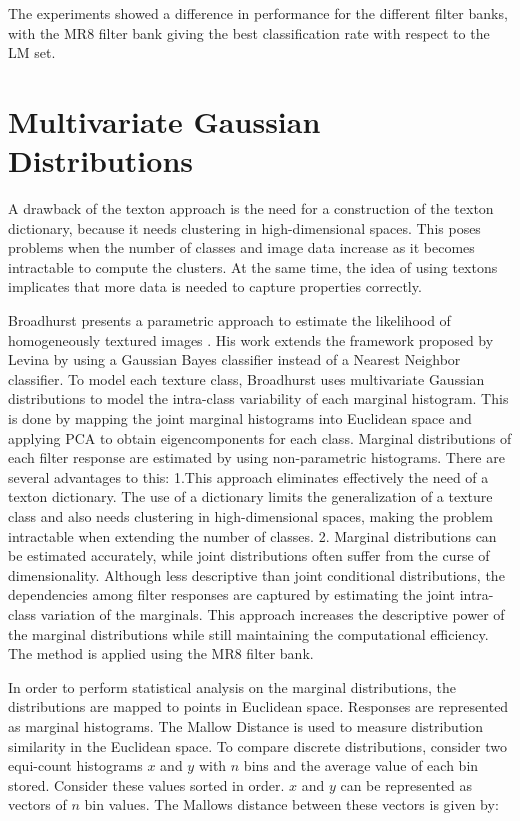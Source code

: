 The experiments showed a difference in performance for the different filter banks, with the MR8 filter bank giving the best classification rate with respect to the LM set. 

\section{Multivariate Gaussian Distributions}\label{sec:MGD}
A drawback of the texton approach is the need for a construction of the texton dictionary, because it needs clustering in high-dimensional spaces. This poses problems when the number of classes and image data increase as it becomes intractable to compute the clusters. At the same time, the idea of using textons implicates that more data is needed to capture properties correctly.

Broadhurst presents a parametric approach to estimate the likelihood of homogeneously textured images \cite{Broadhurst}. His work extends the framework proposed by Levina \cite{Levina} by using a Gaussian Bayes classifier instead of a Nearest Neighbor classifier. To model each texture class, Broadhurst uses multivariate Gaussian distributions to model the intra-class variability of each marginal histogram. This is done by mapping the joint marginal histograms into Euclidean space and applying PCA to obtain eigencomponents for each class.
Marginal distributions of each filter response are estimated by using non-parametric histograms. There are several advantages to this:
	1.This approach eliminates effectively the need of a texton dictionary. The use of a dictionary limits the generalization of a texture class and also needs clustering in high-dimensional spaces, making the problem intractable when extending the number of classes.
	2. Marginal distributions can be estimated accurately, while joint distributions often suffer from the curse of dimensionality.
Although less descriptive than joint conditional distributions, the dependencies among filter responses are captured by estimating the joint intra-class variation of the marginals. This approach increases the descriptive power of the marginal distributions while still maintaining the computational efficiency. The method is applied using the MR8 filter bank.

In order to perform statistical analysis on the marginal distributions, the distributions are mapped to points in Euclidean space. Responses are represented as marginal histograms. The Mallow Distance is used to measure distribution similarity in the Euclidean space. To compare discrete distributions, consider two equi-count histograms $x$ and $y$ with $n$ bins and the average value of each bin stored. Consider these values sorted in order. $x$ and $y$ can be represented as vectors of $n$ bin values. The Mallows distance between these vectors is given by:

